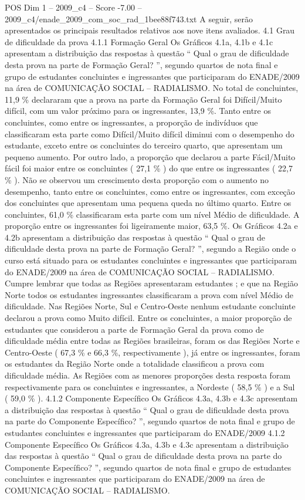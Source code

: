 \begin{textsample}{POS Dim 1 – 2009\_c4 – Score -7.00 – 2009\_c4/enade\_2009\_com\_soc\_rad\_1bee88f743.txt}
A seguir, serão apresentados os principais resultados relativos aos nove itens avaliados. 4.1 Grau de dificuldade da prova 4.1.1 Formação Geral Os Gráficos 4.1a, 4.1b e 4.1c apresentam a distribuição das respostas à questão “ Qual o grau de dificuldade desta prova na parte de Formação Geral? ”, segundo quartos de nota final e grupo de estudantes concluintes e ingressantes que participaram do ENADE/2009 na área de COMUNICAÇÃO SOCIAL – RADIALISMO.
No total de concluintes, 11,9 \% declararam que a prova na parte da Formação Geral foi Difícil/Muito difícil, com um valor próximo para os ingressantes, 13,9 \%.
Tanto entre os concluintes, como entre os ingressantes, a proporção de indivíduos que classificaram esta parte como Difícil/Muito difícil diminui com o desempenho do estudante, exceto entre os concluintes do terceiro quarto, que apresentam um pequeno aumento.
Por outro lado, a proporção que declarou a parte Fácil/Muito fácil foi maior entre os concluintes ( 27,1 \% ) do que entre os ingressantes ( 22,7 \% ).
Não se observou um crescimento desta proporção com o aumento no desempenho, tanto entre os concluintes, como entre os ingressantes, com exceção dos concluintes que apresentam uma pequena queda no último quarto.
Entre os concluintes, 61,0 \% classificaram esta parte com um nível Médio de dificuldade.
A proporção entre os ingressantes foi ligeiramente maior, 63,5 \%.
Os Gráficos 4.2a e 4.2b apresentam a distribuição das respostas à questão “ Qual o grau de dificuldade desta prova na parte de Formação Geral? ”, segundo a Região onde o curso está situado para os estudantes concluintes e ingressantes que participaram do ENADE/2009 na área de COMUNICAÇÃO SOCIAL – RADIALISMO.
Cumpre lembrar que todas as Regiões apresentaram estudantes ; e que na Região Norte todos os estudantes ingressantes classificaram a prova com nível Médio de dificuldade.
Nas Regiões Norte, Sul e Centro-Oeste nenhum estudante concluinte declarou a prova como Muito difícil.
Entre os concluintes, a maior proporção de estudantes que considerou a parte de Formação Geral da prova como de dificuldade média entre todas as Regiões brasileiras, foram os das Regiões Norte e Centro-Oeste ( 67,3 \% e 66,3 \%, respectivamente ), já entre os ingressantes, foram os estudantes da Região Norte onde a totalidade classificou a prova com dificuldade média.
As Regiões com as menores proporções desta resposta foram respectivamente para os concluintes e ingressantes, a Nordeste ( 58,5 \% ) e a Sul ( 59,0 \% ). 4.1.2 Componente Específico Os Gráficos 4.3a, 4.3b e 4.3c apresentam a distribuição das respostas à questão “ Qual o grau de dificuldade desta prova na parte do Componente Específico? ”, segundo quartos de nota final e grupo de estudantes concluintes e ingressantes que participaram do ENADE/2009 4.1.2 Componente Específico Os Gráficos 4.3a, 4.3b e 4.3c apresentam a distribuição das respostas à questão “ Qual o grau de dificuldade desta prova na parte do Componente Específico? ”, segundo quartos de nota final e grupo de estudantes concluintes e ingressantes que participaram do ENADE/2009 na área de COMUNICAÇÃO SOCIAL – RADIALISMO.

\end{textsample}

